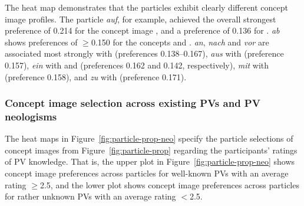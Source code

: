 \documentclass[output=paper]{langsci/langscibook}
\begin{document}
The heat map demonstrates that the particles exhibit clearly different
concept image profiles. The particle \textit{auf}, for example, achieved the
overall strongest preference of 0.214 for the concept image
, and a preference of 0.136 for
. \textit{ab} shows preferences of $\ge$0.150 for the
concepts  and . \textit{an},
\textit{nach} and \textit{vor} are associated most strongly with
 (preferences 0.138--0.167), \textit{aus} with
 (preference 0.157), \textit{ein} with
 and  (preferences 0.162 and
0.142, respectively), \textit{mit} with  (preference
0.158), and \textit{zu} with  (preference 0.171).


\clearpage
\subsubsection{Concept image selection across existing PVs and PV neologisms}

The heat maps in Figure~\ref{fig:particle-prop-neo} specify the
particle selections of concept images from Figure~\ref{fig:particle-prop}
regarding the participants' ratings of PV knowledge. That is, the
upper plot in Figure~\ref{fig:particle-prop-neo} shows concept image preferences
across particles for well-known PVs with an average rating $\ge$2.5,
and the lower plot shows concept image preferences across particles for rather
unknown PVs with an average rating $<$2.5.
\end{document}
